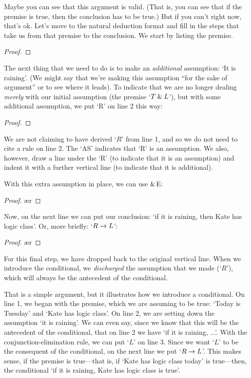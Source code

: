 Maybe you can see that this argument is valid. (That is, you can see that if the premise is true, then the conclusion has to be true.) But if you can't right now, that's ok. Let's move to the natural deduction format and fill in the steps that take us from that premise to the conclusion. We start by listing the premise.
	\begin{proof}
		 
	\end{proof}
The next thing that we need to do is to make an \emph{additional} assumption: `It is raining'. (We might say that we're making this assumption ``for the sake of argument'' or to see where it leads). To indicate that we are no longer dealing \emph{merely} with our initial assumption (the premise `$T \mathbin{\&} L$'), but with some additional assumption, we put `R' on line 2 this way:
	\begin{proof}
		 
		\open
			 
	\end{proof}
We are not claiming to have derived `$R$' from line 1, and so we do not need to cite a rule on line 2. The `AS' indicates that `R' is an assumption. We also, however, draw a line under the `R' (to indicate that it is an assumption) and indent it with a further vertical line (to indicate that it is additional). 

With this extra assumption in place, we can use $\mathbin{\&}$E:
	\begin{proof}
		 
		\open
			 
			\ae{r}
	\end{proof}
Now, on the next line we can put our conclusion: `if it is raining, then Kate has logic class'. Or, more briefly: `$R \rightarrow L$':
	\begin{proof}
		 
		\open
			 
			\ae{r}
			\close
	\end{proof}
For this final step, we have dropped back to the original vertical line. When we introduce the conditional, we \emph{discharged} the assumption that we made (`$R$'), which will always be the antecedent of the conditional. 

That is a simple argument, but it illustrates how we introduce a conditional. On line 1, we began with the premise, which we are assuming to be true: `Today is Tuesday' and `Kate has logic class'. On line 2, we are setting down the assumption `it is raining'. We can even say, since we know that this will be the antecedent of the conditional, that on line 2 we have `if it is raining, ...'. With the conjunction-elimination rule, we can put `$L$' on line 3. Since we want `$L$' to be the consequent of the conditional, on the next line we put `$R \rightarrow L$'. This makes sense, if the premise is true---that is, if `Kate has logic class today' is true---then, the conditional `if it is raining, Kate has logic class is true'. 

